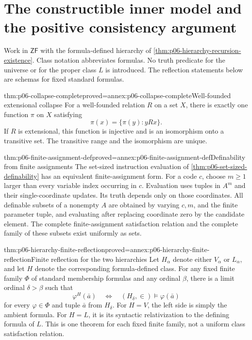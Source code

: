 \section{The constructible inner model and the positive consistency argument}
\label{sec:p06-constructible-inner-model-completion}

Work in \(\mathsf{ZF}\) with the formula-defined hierarchy of
\cref{thm:p06-hierarchy-recursion-existence}.
Class notation abbreviates formulas. No truth predicate for the
universe or for the proper class \(L\) is introduced.
The reflection statements below are schemas for fixed standard formulas.

\begin{hbtheorem}{thm:p06-collapse-complete}{proved=annex:p06-collapse-complete}{Well-founded extensional collapse}
For a well-founded relation \(R\) on a set \(X\), there is exactly one
function \(\pi\) on \(X\) satisfying
\[
 \pi(x)=\{\pi(y):yRx\}.
\]
If \(R\) is extensional, this function is injective and is an
isomorphism onto a transitive set. The transitive range and
the isomorphism are unique.
\end{hbtheorem}

\begin{hblemma}{thm:p06-finite-assignment-def}{proved=annex:p06-finite-assignment-def}{Definability from finite assignments}
The set-sized instruction evaluation of
\cref{thm:p06-set-sized-definability}
has an equivalent finite-assignment form.
For a code \(c\), choose \(m\geq1\) larger than every variable
index occurring in \(c\). Evaluation uses tuples in \(A^m\)
and their single-coordinate updates.
Its truth depends only on those coordinates.
All definable subsets of a nonempty \(A\) are obtained by
varying \(c,m\), and the finite parameter tuple, and evaluating
after replacing coordinate zero by the candidate element.
The complete finite-assignment satisfaction relation and the
complete family of these subsets exist uniformly as sets.
\end{hblemma}

\begin{hbtheorem}{thm:p06-hierarchy-finite-reflection}{proved=annex:p06-hierarchy-finite-reflection}{Finite reflection for the two hierarchies}
Let \(H_\alpha\) denote either \(V_\alpha\) or \(L_\alpha\),
and let \(H\) denote the corresponding formula-defined class.
For any fixed finite family \(\Phi\) of standard membership formulas
and any ordinal \(\beta\), there is a limit ordinal \(\delta>\beta\)
such that
\[
 \varphi^H(\bar a)
 \quad\Longleftrightarrow\quad
 (H_\delta,\in)\models\varphi(\bar a)
\]
for every \(\varphi\in\Phi\) and tuple \(\bar a\) from \(H_\delta\).
For \(H=V\), the left side is simply the ambient formula.
For \(H=L\), it is its syntactic relativization to the defining
formula of \(L\).
This is one theorem for each fixed finite family, not a uniform
class satisfaction relation.
\end{hbtheorem}

